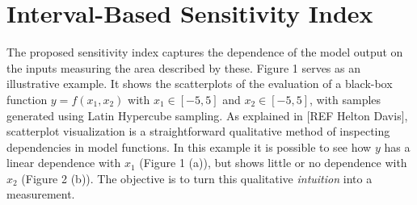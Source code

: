 \documentclass[twocolumn]{rps-esrel2022}
\begin{document}
\section{Interval-Based Sensitivity Index}

The proposed sensitivity index captures the dependence of the model output on the inputs measuring the area described by these. %
Figure 1 serves as an illustrative example.
It shows the scatterplots of the evaluation of a black-box function $y = f(x_1,x_2)$ with $x_1 \in [-5,5]$ and $x_2 \in [-5,5]$, with samples generated using
Latin Hypercube sampling.
As explained in [REF Helton Davis], scatterplot visualization is a straightforward qualitative method of inspecting dependencies in model functions.
In this example it is possible to see how $y$ has a linear dependence with $x_1$ (Figure 1 (a)), but shows little or no dependence with $x_2$ (Figure 2 (b)).
The objective is to turn this qualitative \textit{intuition} into a measurement.
\end{document}
